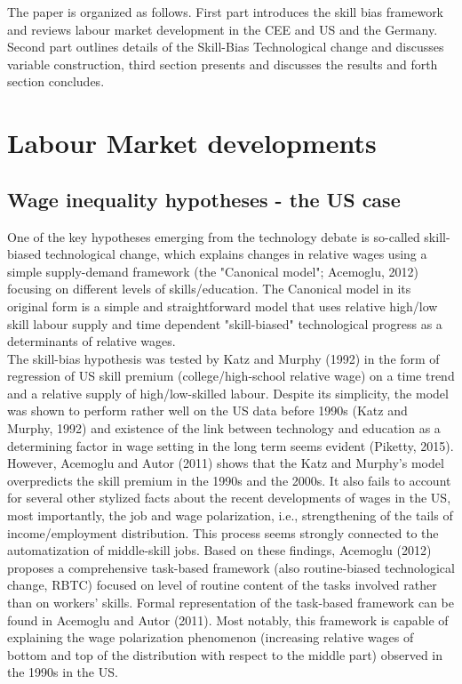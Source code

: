 \documentclass{article}
\begin{document}
The paper is organized as follows. First part introduces the skill bias framework and reviews labour market development in the CEE and US and the Germany. Second part outlines details of the Skill-Bias Technological change and discusses variable construction, third section presents and discusses the results and forth section concludes.

\section{Labour Market developments}
\subsection{Wage inequality hypotheses - the US case}

One of the key hypotheses emerging from the technology debate is so-called skill-biased technological change, which explains changes in relative wages using a simple supply-demand framework (the "Canonical model"; Acemoglu, 2012) focusing on different levels of skills/education. The Canonical model in its original form is a simple and straightforward model that uses relative high/low skill labour supply and time dependent "skill-biased" technological progress as a determinants of relative wages.\\
The skill-bias hypothesis was tested by Katz and Murphy (1992) in the form of regression of US skill premium (college/high-school relative wage) on a time trend and a relative supply of high/low-skilled labour. Despite its simplicity, the model was shown to perform rather well on the US data before 1990s (Katz and Murphy, 1992) and existence of the link between technology and education as a determining factor in wage setting in the long term seems evident (Piketty, 2015). However, Acemoglu and Autor (2011) shows that the Katz and Murphy's model overpredicts the skill premium in the 1990s and the 2000s. It also fails to account for several other stylized facts about the recent developments of wages in the US, most importantly, the job and wage polarization, i.e., strengthening of the tails of income/employment distribution. This process seems strongly connected to the automatization of middle-skill jobs. Based on these findings, Acemoglu (2012) proposes a comprehensive task-based framework (also routine-biased technological change, RBTC) focused on level of routine content of the tasks involved rather than on workers' skills. Formal representation of the task-based framework can be found in Acemoglu and Autor (2011). Most notably, this framework is capable of explaining the wage polarization phenomenon (increasing relative wages of bottom and top of the distribution with respect to the middle part) observed in the 1990s in the US.\\
\end{document}
